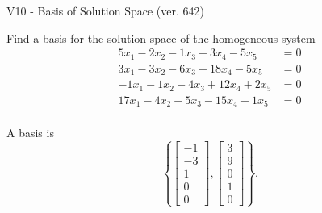 \begin{exercise}
  \begin{exerciseTitle}V10 - Basis of Solution Space (ver. 642)\end{exerciseTitle}
  \begin{exerciseStatement}
    Find a basis for the solution space of the homogeneous system 
\begin{align*}
 5 x_ 1 -2 x_ 2 -1 x_ 3 + 3 x_ 4 -5 x_ 5 &= 0  \\ 
  3 x_ 1 -3 x_ 2 -6 x_ 3 + 18 x_ 4 -5 x_ 5 &= 0  \\ 
  -1 x_ 1 -1 x_ 2 -4 x_ 3 + 12 x_ 4 + 2 x_ 5 &= 0  \\ 
  17 x_ 1 -4 x_ 2 + 5 x_ 3 -15 x_ 4 + 1 x_ 5 &= 0  \\ 
 \end{align*}


 
  \end{exerciseStatement}

  \begin{exerciseAnswer}
   A basis is   
\[\left\{\left[\begin{array}{c}
-1 \\
-3 \\
1 \\
0 \\
0
\end{array}\right] , \left[\begin{array}{c}
3 \\
9 \\
0 \\
1 \\
0
\end{array}\right]\right\}.\]

  


  \end{exerciseAnswer}
\end{exercise}